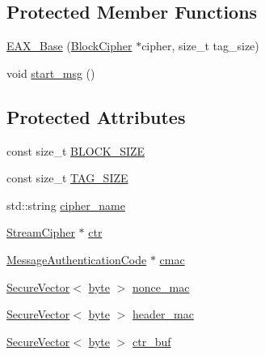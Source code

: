 \subsection*{Protected Member Functions}
\begin{DoxyCompactItemize}
\item 
\hyperlink{classBotan_1_1EAX__Base_a872c52a18b3c32c87a8a70c5a5164797}{E\-A\-X\-\_\-\-Base} (\hyperlink{classBotan_1_1BlockCipher}{Block\-Cipher} $\ast$cipher, size\-\_\-t tag\-\_\-size)
\item 
void \hyperlink{classBotan_1_1EAX__Base_ae91753d8cc76dd7cb38edfbbf6a28ae7}{start\-\_\-msg} ()
\end{DoxyCompactItemize}
\subsection*{Protected Attributes}
\begin{DoxyCompactItemize}
\item 
const size\-\_\-t \hyperlink{classBotan_1_1EAX__Base_a521d9a389089f56e77c02e55f46ad66a}{B\-L\-O\-C\-K\-\_\-\-S\-I\-Z\-E}
\item 
const size\-\_\-t \hyperlink{classBotan_1_1EAX__Base_a0f7194e963f89bccdfb1801132f271a1}{T\-A\-G\-\_\-\-S\-I\-Z\-E}
\item 
std\-::string \hyperlink{classBotan_1_1EAX__Base_a5b8212657abf64e8d8d942699bd09159}{cipher\-\_\-name}
\item 
\hyperlink{classBotan_1_1StreamCipher}{Stream\-Cipher} $\ast$ \hyperlink{classBotan_1_1EAX__Base_ad8830a9fd4b01dc4599b4f690ebea28b}{ctr}
\item 
\hyperlink{classBotan_1_1MessageAuthenticationCode}{Message\-Authentication\-Code} $\ast$ \hyperlink{classBotan_1_1EAX__Base_a806a71dabe3226d0241423fc45ea67e0}{cmac}
\item 
\hyperlink{classBotan_1_1SecureVector}{Secure\-Vector}$<$ \hyperlink{namespaceBotan_a7d793989d801281df48c6b19616b8b84}{byte} $>$ \hyperlink{classBotan_1_1EAX__Base_a9c45bb808c6642a083619654e6809f86}{nonce\-\_\-mac}
\item 
\hyperlink{classBotan_1_1SecureVector}{Secure\-Vector}$<$ \hyperlink{namespaceBotan_a7d793989d801281df48c6b19616b8b84}{byte} $>$ \hyperlink{classBotan_1_1EAX__Base_a78d02509f0aa211c3f3ef6a708470bbe}{header\-\_\-mac}
\item 
\hyperlink{classBotan_1_1SecureVector}{Secure\-Vector}$<$ \hyperlink{namespaceBotan_a7d793989d801281df48c6b19616b8b84}{byte} $>$ \hyperlink{classBotan_1_1EAX__Base_a0fd5a38b386d0ce1fc2cdcfede7171f2}{ctr\-\_\-buf}
\end{DoxyCompactItemize}


